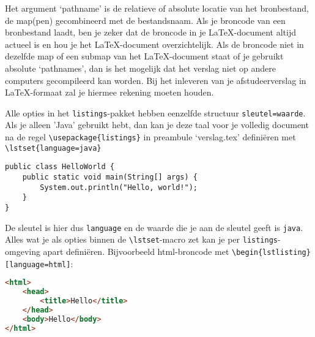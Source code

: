 Het argument `pathname' is de relatieve of absolute locatie van het
bronbestand, de map(pen) gecombineerd met de bestandsnaam. Als je
broncode van een bronbestand laadt, ben je zeker dat de broncode in je
\LaTeX{}-document altijd actueel is en hou je het \LaTeX{}-document
overzichtelijk. Als de broncode niet in dezelfde map of een submap van
het \LaTeX{}-document staat of je gebruikt absolute `pathnames', dan
is het mogelijk dat het verslag niet op andere computers gecompileerd
kan worden. Bij het inleveren van je afstudeerverslag in
\LaTeX{}-formaat zal je hiermee rekening moeten houden.


Alle opties in het \verb!listings!-pakket hebben eenzelfde structuur
\verb!sleutel=waarde!. Als je alleen 'Java' gebruikt hebt, dan kan je
deze taal voor je volledig document na de regel
\verb!\usepackage{listings}! in preambule `verslag.tex' definiëren met
\verb!\lstset{language=java}!

\lstset{language=java}

\begin{Aanpassen}
\begin{lstlisting}
public class HelloWorld {
    public static void main(String[] args) {
        System.out.println("Hello, world!");
    }
}
\end{lstlisting}
\end{Aanpassen}


De sleutel is hier dus \verb!language! en de waarde die je aan de
sleutel geeft is \verb!java!. Alles wat je als opties binnen de
\verb!\lstset!-macro zet kan je per \verb!listings!-omgeving apart
definiëren. Bijvoorbeeld html-broncode met
\verb!\begin{lstlisting}[language=html]!:

\begin{Aanpassen}
\begin{lstlisting}[language=html]
<html>
    <head>
        <title>Hello</title>
    </head>
    <body>Hello</body>
</html>
\end{lstlisting}
\end{Aanpassen}

\newpage
{}

\parindent0pt
%


